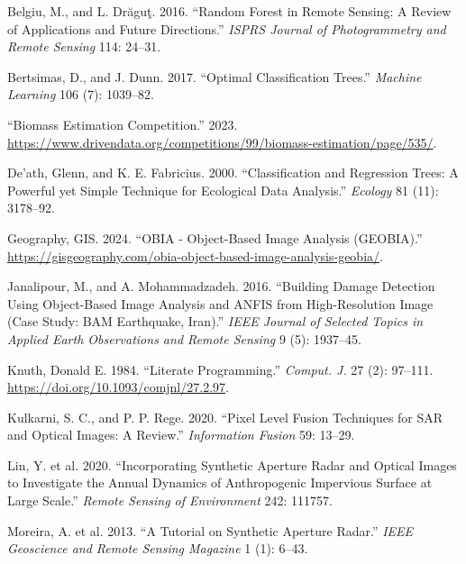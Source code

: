 \documentclass[
  letterpaper,
  DIV=11,
  numbers=noendperiod]{scrreprt}
\newlength{\cslhangindent}
\newenvironment{CSLReferences}[2] %
 {\begin{list}{}{%
  \setlength{\itemindent}{0pt}
  \setlength{\leftmargin}{0pt}
  \setlength{\parsep}{0pt}
  \ifodd #1
   \setlength{\leftmargin}{\cslhangindent}
   \setlength{\itemindent}{-1\cslhangindent}
  \fi
  \setlength{\itemsep}{#2\baselineskip}}}
 {\end{list}}
\begin{document}
\label{refs}
\begin{CSLReferences}{1}{0}
Belgiu, M., and L. Drăguţ. 2016. {``Random Forest in Remote Sensing: A
Review of Applications and Future Directions.''} \emph{ISPRS Journal of
Photogrammetry and Remote Sensing} 114: 24--31.

Bertsimas, D., and J. Dunn. 2017. {``Optimal Classification Trees.''}
\emph{Machine Learning} 106 (7): 1039--82.

{``Biomass Estimation Competition.''} 2023.
\url{https://www.drivendata.org/competitions/99/biomass-estimation/page/535/}.

De'ath, Glenn, and K. E. Fabricius. 2000. {``Classification and
Regression Trees: A Powerful yet Simple Technique for Ecological Data
Analysis.''} \emph{Ecology} 81 (11): 3178--92.

Geography, GIS. 2024. {``OBIA - Object-Based Image Analysis (GEOBIA).''}
\url{https://gisgeography.com/obia-object-based-image-analysis-geobia/}.

Janalipour, M., and A. Mohammadzadeh. 2016. {``Building Damage Detection
Using Object-Based Image Analysis and ANFIS from High-Resolution Image
(Case Study: BAM Earthquake, Iran).''} \emph{IEEE Journal of Selected
Topics in Applied Earth Observations and Remote Sensing} 9 (5):
1937--45.

Knuth, Donald E. 1984. {``Literate Programming.''} \emph{Comput. J.} 27
(2): 97--111. \url{https://doi.org/10.1093/comjnl/27.2.97}.

Kulkarni, S. C., and P. P. Rege. 2020. {``Pixel Level Fusion Techniques
for SAR and Optical Images: A Review.''} \emph{Information Fusion} 59:
13--29.

Lin, Y. et al. 2020. {``Incorporating Synthetic Aperture Radar and
Optical Images to Investigate the Annual Dynamics of Anthropogenic
Impervious Surface at Large Scale.''} \emph{Remote Sensing of
Environment} 242: 111757.

Moreira, A. et al. 2013. {``A Tutorial on Synthetic Aperture Radar.''}
\emph{IEEE Geoscience and Remote Sensing Magazine} 1 (1): 6--43.


\end{CSLReferences}
\end{document}
